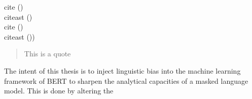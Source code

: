 \documentclass[english]{ttlab-qualify}
\begin{document}
    cite (\cite{METZLER2016})\\
    citeast (\cite*{METZLER2016})\\

    cite (\cite{DEEPL})\\
    citeast ()\cite*{DEEPL})\\

    \begin{quote}
        This is a quote
    \end{quote}
    The intent of this thesis is to inject linguistic bias into the machine learning framework of BERT to sharpen the analytical capacities of a masked language model.
    This is done by altering the
    \appendix
    \printbibliography
\end{document}
